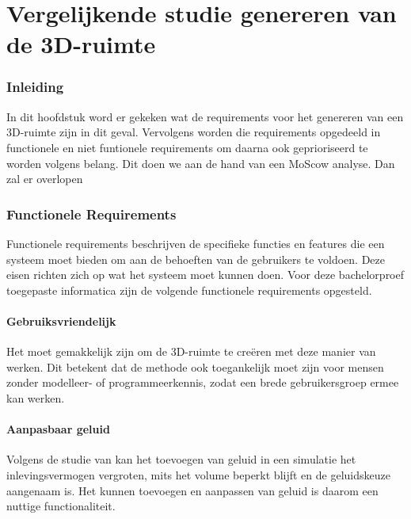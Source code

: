 
\chapter{Vergelijkende studie genereren van de 3D-ruimte}%
\label{ch:requirements1}

\subsection{Inleiding}

In dit hoofdstuk word er gekeken wat de requirements voor het genereren van een 3D-ruimte zijn in dit geval. Vervolgens worden die requirements opgedeeld in functionele en niet funtionele requirements om daarna ook geprioriseerd te worden volgens belang. Dit doen we aan de hand van een MoScow analyse. Dan zal er overlopen

\subsection{Functionele Requirements}

Functionele requirements beschrijven de specifieke functies en features die een systeem moet bieden om aan de behoeften van de gebruikers te voldoen. Deze eisen richten zich op wat het systeem moet kunnen doen. Voor deze bachelorproef toegepaste informatica zijn de volgende functionele requirements opgesteld.

\subsubsection{Gebruiksvriendelijk}

Het moet gemakkelijk zijn om de 3D-ruimte te creëren met deze manier van werken. Dit betekent dat de methode ook toegankelijk moet zijn voor mensen zonder modelleer- of programmeerkennis, zodat een brede gebruikersgroep ermee kan werken.

\subsubsection{Aanpasbaar geluid}

Volgens de studie van \textcite{Raes2023} kan het toevoegen van geluid in een simulatie het inlevingsvermogen vergroten, mits het volume beperkt blijft en de geluidskeuze aangenaam is. Het kunnen toevoegen en aanpassen van geluid is daarom een nuttige functionaliteit.

